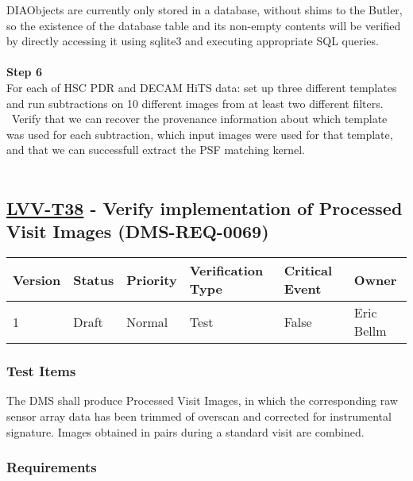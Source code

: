 DIAObjects are currently only stored in a database, without shims to the
Butler, so the existence of the database table and its non-empty
contents will be verified by directly accessing it using sqlite3 and
executing appropriate SQL queries.\\
~\\
\textbf{Step 6}\\
For each of HSC PDR and DECAM HiTS data: set up three different
templates and run subtractions on 10 different images from at least two
different filters. ~Verify that we can recover the provenance
information about which template was used for each subtraction, which
input images were used for that template, and that we can successfull
extract the PSF matching kernel.\\
~\\

\hypertarget{lvv-t38---verify-implementation-of-processed-visit-images-dms-req-0069}{%
\subsection{\texorpdfstring{\href{https://jira.lsstcorp.org/secure/Tests.jspa\#/testCase/LVV-T38}{LVV-T38}
- Verify implementation of Processed Visit Images
(DMS-REQ-0069)}{LVV-T38 - Verify implementation of Processed Visit Images (DMS-REQ-0069)}}\label{lvv-t38---verify-implementation-of-processed-visit-images-dms-req-0069}}

\begin{longtable}[]{@{}llllll@{}}
\toprule
Version & Status & Priority & Verification Type & Critical Event &
Owner\tabularnewline
\midrule
\endhead
1 & Draft & Normal & Test & False & Eric Bellm\tabularnewline
\bottomrule
\end{longtable}

\hypertarget{test-items-14}{%
\subsubsection{Test Items}\label{test-items-14}}

The DMS shall produce Processed Visit Images, in which the corresponding
raw sensor array data has been trimmed of overscan and corrected for
instrumental signature. Images obtained in pairs during a standard visit
are combined.

\hypertarget{requirements-15}{%
\subsubsection{Requirements}\label{requirements-15}}

